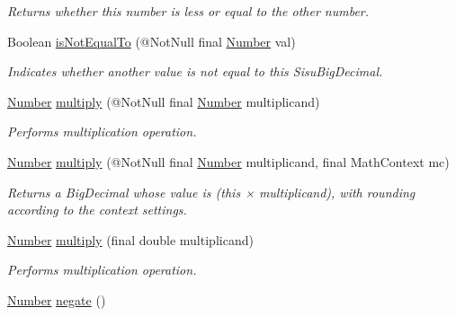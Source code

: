 \begin{DoxyCompactItemize}
\begin{DoxyCompactList}\small\item\em Returns whether this number is less or equal to the other number. \end{DoxyCompactList}\item 
Boolean \hyperlink{classcom_1_1aarrelaakso_1_1drawl_1_1_drawl_number_a9d60605e816e0cb6430545fa3ea28b19}{is\+Not\+Equal\+To} (@Not\+Null final \hyperlink{interfacecom_1_1aarrelaakso_1_1drawl_1_1_number}{Number} val)
\begin{DoxyCompactList}\small\item\em Indicates whether another value is not equal to this Sisu\+Big\+Decimal. \end{DoxyCompactList}\item 
\hyperlink{interfacecom_1_1aarrelaakso_1_1drawl_1_1_number}{Number} \hyperlink{classcom_1_1aarrelaakso_1_1drawl_1_1_drawl_number_ad26a515fb406363d921543b82c428b46}{multiply} (@Not\+Null final \hyperlink{interfacecom_1_1aarrelaakso_1_1drawl_1_1_number}{Number} multiplicand)
\begin{DoxyCompactList}\small\item\em Performs multiplication operation. \end{DoxyCompactList}\item 
\hyperlink{interfacecom_1_1aarrelaakso_1_1drawl_1_1_number}{Number} \hyperlink{classcom_1_1aarrelaakso_1_1drawl_1_1_drawl_number_a11144527a91f9a750b9042a3ac84f631}{multiply} (@Not\+Null final \hyperlink{interfacecom_1_1aarrelaakso_1_1drawl_1_1_number}{Number} multiplicand, final Math\+Context mc)
\begin{DoxyCompactList}\small\item\em Returns a Big\+Decimal whose value is (this × multiplicand), with rounding according to the context settings. \end{DoxyCompactList}\item 
\hyperlink{interfacecom_1_1aarrelaakso_1_1drawl_1_1_number}{Number} \hyperlink{classcom_1_1aarrelaakso_1_1drawl_1_1_drawl_number_a5595b3908527eb8a893f9c0a5d061677}{multiply} (final double multiplicand)
\begin{DoxyCompactList}\small\item\em Performs multiplication operation. \end{DoxyCompactList}\item 
\hyperlink{interfacecom_1_1aarrelaakso_1_1drawl_1_1_number}{Number} \hyperlink{classcom_1_1aarrelaakso_1_1drawl_1_1_drawl_number_a7cfa9c1e6042505b82277cb795cc84e3}{negate} ()

\end{DoxyCompactItemize}
